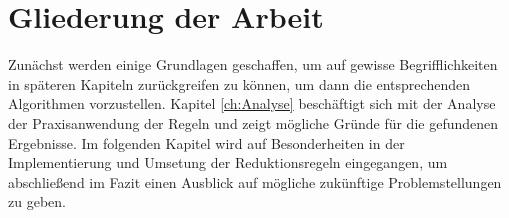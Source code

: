\section{Gliederung der Arbeit}
\label{ch:Einleitung:sec:Gliederung}

Zunächst werden einige Grundlagen geschaffen, um auf gewisse Begrifflichkeiten in späteren Kapiteln zurückgreifen zu können, um dann die entsprechenden Algorithmen vorzustellen. Kapitel \ref{ch:Analyse} beschäftigt sich mit der Analyse der Praxisanwendung der Regeln und zeigt mögliche Gründe für die gefundenen Ergebnisse. Im folgenden Kapitel wird auf Besonderheiten in der Implementierung und Umsetung der Reduktionsregeln eingegangen, um abschließend im Fazit einen Ausblick auf mögliche zukünftige Problemstellungen zu geben.






